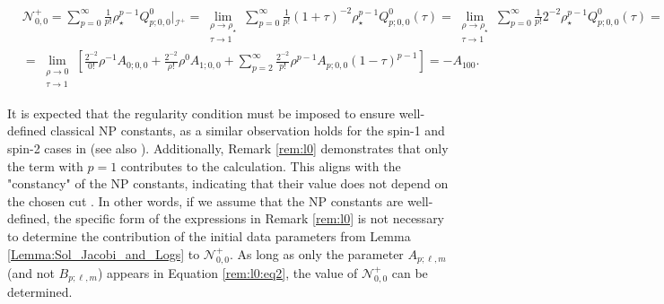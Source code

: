 \begin{align}
  &\mathcal{N}^{+}_{0,0}= \sum_{p=0}^{\infty} \frac{1}{p!}\rho^{p-1}_{\star}Q^{0}_{p;0,0}|_{\mathscr{I}^{+}} = \lim_{\substack{\rho \to \rho_{\star} \\ \tau \to 1}} \sum_{p=0}^{\infty} \frac{1}{p !}(1+\tau)^{-2} \rho_{\star}^{p-1} Q_{p; 0,0}^{0}(\tau) = \lim_{\substack{\rho \to \rho_{\star} \\ \tau \to 1}}\sum_{p=0}^{\infty} \frac{1}{p !} 2^{-2} \rho_{\star}^{p-1} Q_{p; 0,0}^{0}(\tau) = \nonumber \\
  & = \lim_{\substack{\rho \to 0 \\ \tau \to 1}}\left[\frac{2^{-2}}{0 !} \rho^{-1} A_{0;0,0} +\frac{2^{-2}}{\rho !} \rho^{0} A_{1;0,0} +\sum_{p=2}^{\infty} \frac{2^{-2}}{p !} \rho^{p-1} A_{p;0,0}(1-\tau)^{p-1}\right] = -A_{100}.
\end{align}

It is expected that the regularity condition must be imposed to ensure well-defined classical NP constants, as a similar observation holds for the spin-1 and spin-2 cases in \cite{GasVal20} (see also \cite{Val98, Val99a}). Additionally, Remark \ref{rem:l0} demonstrates that only the term with $p=1$ contributes to the calculation. This aligns with the "constancy" of the NP constants, indicating that their value does not depend on the chosen cut \cite{NewPen68}. In other words, if we assume that the NP constants are well-defined, the specific form of the expressions in Remark \ref{rem:l0} is not necessary to determine the contribution of the initial data parameters from Lemma \ref{Lemma:Sol_Jacobi_and_Logs} to $\mathcal{N}^{+}_{0,0}$. As long as only the parameter $A_{p;\ell,m}$ (and not $B_{p;\ell,m}$) appears in Equation \ref{rem:l0:eq2}, the value of $\mathcal{N}^{+}_{0,0}$ can be determined. 
\pagebreak

